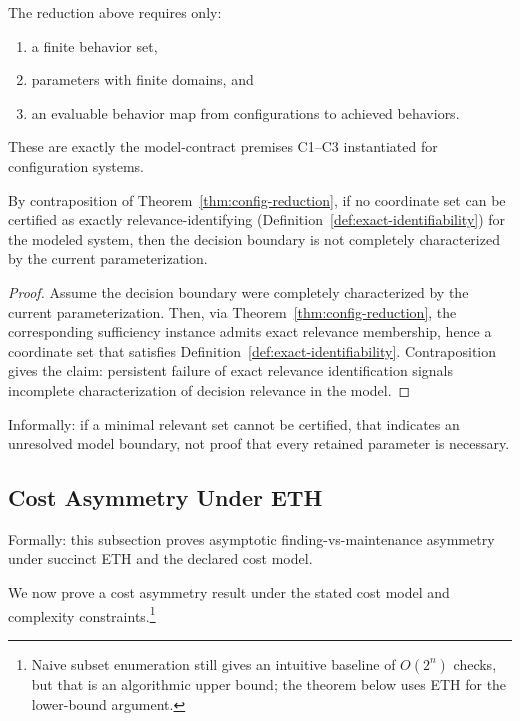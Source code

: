 \begin{remark}
The reduction above requires only:
\begin{enumerate}
\item a finite behavior set,
\item parameters with finite domains, and
\item an evaluable behavior map from configurations to achieved behaviors.
\end{enumerate}
These are exactly the model-contract premises C1--C3 instantiated for configuration systems.
\end{remark}

\begin{theorem}
\label{thm:overmodel-diagnostic}
By contraposition of Theorem~\ref{thm:config-reduction}, if no coordinate set can be certified as exactly relevance-identifying (Definition~\ref{def:exact-identifiability}) for the modeled system, then the decision boundary is not completely characterized by the current parameterization.
\end{theorem}

\begin{proof}
Assume the decision boundary were completely characterized by the current parameterization. Then, via Theorem~\ref{thm:config-reduction}, the corresponding sufficiency instance admits exact relevance membership, hence a coordinate set that satisfies Definition~\ref{def:exact-identifiability}. Contraposition gives the claim: persistent failure of exact relevance identification signals incomplete characterization of decision relevance in the model.
\end{proof}

Informally: if a minimal relevant set cannot be certified, that indicates an unresolved model boundary, not proof that every retained parameter is necessary.

\subsection{Cost Asymmetry Under ETH}

Formally: this subsection proves asymptotic finding-vs-maintenance asymmetry under succinct ETH and the declared cost model.

We now prove a cost asymmetry result under the stated cost model and complexity constraints.\footnote{Naive subset enumeration still gives an intuitive baseline of $O(2^n)$ checks, but that is an algorithmic upper bound; the theorem below uses ETH for the lower-bound argument.}

